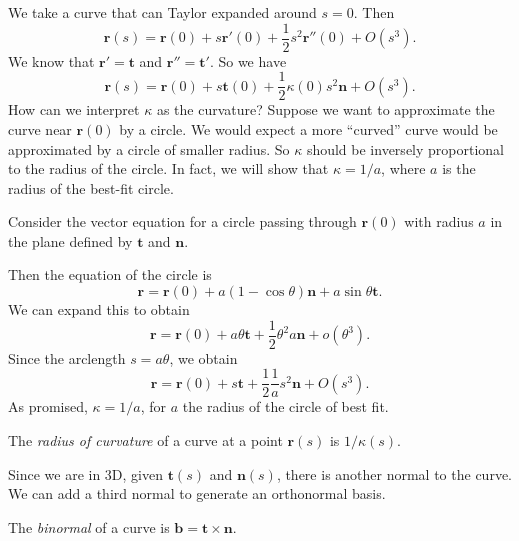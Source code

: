 \documentclass[a4paper]{article}
\begin{document}
We take a curve that can Taylor expanded around $s = 0$. Then
\[
  \mathbf{r}(s) = \mathbf{r}(0) + s\mathbf{r}'(0) + \frac{1}{2}s^2 \mathbf{r}''(0) + O(s^3).
\]
We know that $\mathbf{r}' = \mathbf{t}$ and $\mathbf{r}'' = \mathbf{t}'$. So we have
\[
  \mathbf{r}(s) = \mathbf{r}(0) + s\mathbf{t}(0) + \frac{1}{2}\kappa(0) s^2 \mathbf{n} + O(s^3).
\]
How can we interpret $\kappa$ as the curvature? Suppose we want to approximate the curve near $\mathbf{r}(0)$ by a circle. We would expect a more ``curved'' curve would be approximated by a circle of smaller radius. So $\kappa$ should be inversely proportional to the radius of the circle. In fact, we will show that $\kappa = 1/a$, where $a$ is the radius of the best-fit circle.

Consider the vector equation for a circle passing through $\mathbf{r}(0)$ with radius $a$ in the plane defined by $\mathbf{t}$ and $\mathbf{n}$.
\begin{center}
\end{center}
Then the equation of the circle is
\[
  \mathbf{r} = \mathbf{r}(0) + a(1 - \cos \theta) \mathbf{n} + a\sin \theta \mathbf{t}.
\]
We can expand this to obtain
\[
  \mathbf{r} = \mathbf{r}(0) + a\theta \mathbf{t} + \frac{1}{2}\theta^2 a\mathbf{n} + o(\theta^3).
\]
Since the arclength $s = a\theta$, we obtain
\[
  \mathbf{r} = \mathbf{r}(0) + s\mathbf{t} + \frac{1}{2}\frac{1}{a}s^2\mathbf{n} + O(s^3).
\]
As promised, $\kappa = 1/a$, for $a$ the radius of the circle of best fit.

\begin{defi}
  The \emph{radius of curvature} of a curve at a point $\mathbf{r}(s)$ is $1/\kappa(s)$.
\end{defi}
Since we are in 3D, given $\mathbf{t}(s)$ and $\mathbf{n}(s)$, there is another normal to the curve. We can add a third normal to generate an orthonormal basis.
\begin{defi}[Binormal]
  The \emph{binormal} of a curve is $\mathbf{b} = \mathbf{t}\times \mathbf{n}$.
\end{defi}
\end{document}
